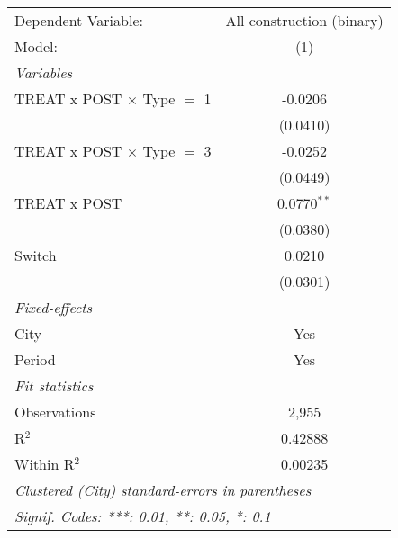 \begingroup
\centering
\begin{tabular}{lc}
   \tabularnewline \midrule \midrule
   Dependent Variable:               & All construction (binary)\\  
   Model:                            & (1)\\  
   \midrule
   \emph{Variables}\\
   TREAT x POST $\times$ Type $=$ 1  & -0.0206\\   
                                     & (0.0410)\\   
   TREAT x POST $\times$ Type $=$ 3  & -0.0252\\   
                                     & (0.0449)\\   
   TREAT x POST                      & 0.0770$^{**}$\\   
                                     & (0.0380)\\   
   Switch                            & 0.0210\\   
                                     & (0.0301)\\   
   \midrule
   \emph{Fixed-effects}\\
   City                              & Yes\\  
   Period                            & Yes\\  
   \midrule
   \emph{Fit statistics}\\
   Observations                      & 2,955\\  
   R$^2$                             & 0.42888\\  
   Within R$^2$                      & 0.00235\\  
   \midrule \midrule
   \multicolumn{2}{l}{\emph{Clustered (City) standard-errors in parentheses}}\\
   \multicolumn{2}{l}{\emph{Signif. Codes: ***: 0.01, **: 0.05, *: 0.1}}\\
\end{tabular}
\par\endgroup
